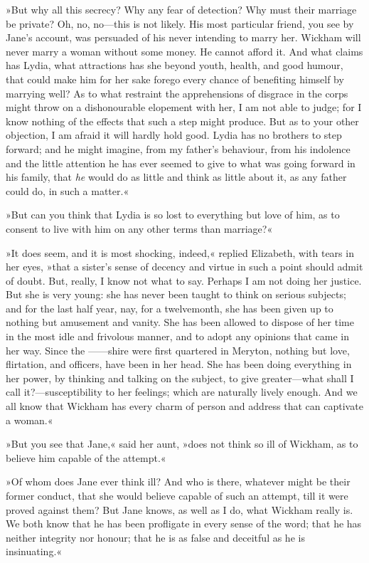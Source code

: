»But why all this secrecy? Why any fear of detection? Why must their marriage be private? Oh, no, no—this is not likely. His most particular friend, you see by Jane's account, was persuaded of his never intending to marry her. Wickham will never marry a woman without some money. He cannot afford it. And what claims has Lydia, what attractions has she beyond youth, health, and good humour, that could make him for her sake forego every chance of benefiting himself by marrying well? As to what restraint the apprehensions of disgrace in the corps might throw on a dishonourable elopement with her, I am not able to judge; for I know nothing of the effects that such a step might produce. But as to your other objection, I am afraid it will hardly hold good. Lydia has no brothers to step forward; and he might imagine, from my father's behaviour, from his indolence and the little attention he has ever seemed to give to what was going forward in his family, that \textit{he} would do as little and think as little about it, as any father could do, in such a matter.«

»But can you think that Lydia is so lost to everything but love of him, as to consent to live with him on any other terms than marriage?«

»It does seem, and it is most shocking, indeed,« replied Elizabeth, with tears in her eyes, »that a sister's sense of decency and virtue in such a point should admit of doubt. But, really, I know not what to say. Perhaps I am not doing her justice. But she is very young: she has never been taught to think on serious subjects; and for the last half year, nay, for a twelvemonth, she has been given up to nothing but amusement and vanity. She has been allowed to dispose of her time in the most idle and frivolous manner, and to adopt any opinions that came in her way. Since the ——shire were first quartered in Meryton, nothing but love, flirtation, and officers, have been in her head. She has been doing everything in her power, by thinking and talking on the subject, to give greater—what shall I call it?—susceptibility to her feelings; which are naturally lively enough. And we all know that Wickham has every charm of person and address that can captivate a woman.«

»But you see that Jane,« said her aunt, »does not think so ill of Wickham, as to believe him capable of the attempt.«

»Of whom does Jane ever think ill? And who is there, whatever might be their former conduct, that she would believe capable of such an attempt, till it were proved against them? But Jane knows, as well as I do, what Wickham really is. We both know that he has been profligate in every sense of the word; that he has neither integrity nor honour; that he is as false and deceitful as he is insinuating.«

